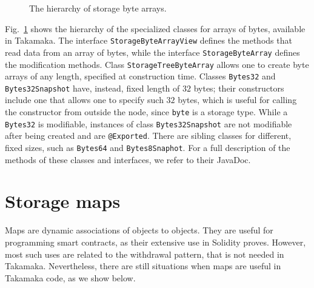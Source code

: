 \begin{figure}[th!]
\begin{center}
  \end{center}
  \caption{The hierarchy of storage byte arrays.}
  \label{fig:byte_arrays_hierarchy}
\end{figure}

Fig.~\ref{fig:byte_arrays_hierarchy} shows the hierarchy of the specialized classes for arrays of bytes,
available in Takamaka.
The interface \texttt{StorageByteArrayView}
defines the methods that read data from an array
of bytes, while the interface \texttt{StorageByteArray}
defines the modification methods.
Class \texttt{StorageTreeByteArray}
allows one to create byte arrays of any length, specified at construction time.
Classes \texttt{Bytes32} and
\texttt{Bytes32Snapshot}
have, instead, fixed length of $32$ bytes;
their constructors include one that allows one to specify such $32$ bytes,
which is useful for calling the constructor from outside the node,
since \texttt{byte} is a storage type.
While a \texttt{Bytes32} is modifiable, instances of class \texttt{Bytes32Snapshot}
are not modifiable after being created and are \texttt{@Exported}.
There are sibling classes for different, fixed sizes, such as
\texttt{Bytes64} and \texttt{Bytes8Snaphot}. For a full description of the methods
of these classes and interfaces, we refer to their JavaDoc.

\section{Storage maps}\label{sec:storage_maps}

Maps are dynamic associations of objects to objects. They are useful
for programming smart contracts, as their extensive use in Solidity proves.
However, most such uses are related to the withdrawal pattern, that is
not needed in Takamaka. Nevertheless, there are still situations when
maps are useful in Takamaka code, as we show below.

